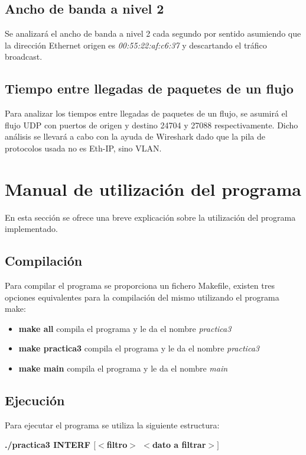 \documentclass[a4paper, 11pt]{article}	%
\begin{document}
\subsection{Ancho de banda a nivel 2}
Se analizará el ancho de banda a nivel 2 cada segundo por sentido asumiendo que la dirección Ethernet origen es \textit{00:55:22:af:c6:37} y descartando el tráfico broadcast.

\subsection{Tiempo entre llegadas de paquetes de un flujo}
Para analizar los tiempos entre llegadas de paquetes de un flujo, se asumirá el flujo UDP con puertos de origen y destino 24704 y 27088 respectivamente. Dicho análisis se llevará a cabo con la ayuda de Wireshark dado que la pila de protocolos usada no es Eth-IP, sino VLAN.

\newpage
\appendix
\renewcommand\appendixname{Anexo}
\section{Manual de utilización del programa}
\label{sec:manual}
En esta sección se ofrece una breve explicación sobre la utilización del programa implementado.
\subsection{Compilación}
Para compilar el programa se proporciona un fichero Makefile, existen tres opciones equivalentes para la compilación del mismo utilizando el programa make:
\begin{itemize}
\item \textbf{make all} compila el programa y le da el nombre \textit{practica3}
\item \textbf{make practica3} compila el programa y le da el nombre \textit{practica3}
\item \textbf{make main} compila el programa y le da el nombre \textit{main}
\end{itemize}

\subsection{Ejecución}
Para ejecutar el programa se utiliza la siguiente estructura:

\begin{center}
\textbf{./practica3 INTERF $[<$filtro$>$ $<$dato a filtrar$>]$}
\end{center}
\end{document}
